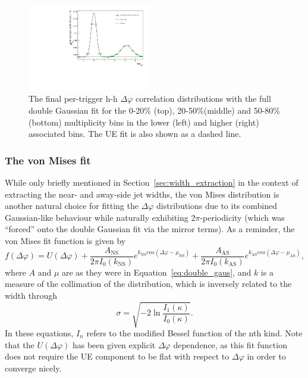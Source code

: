 \begin{figure}[ht]
    \includegraphics[width=0.48\textwidth]{figures/analysis/h_h_dphi_gaus_50_80_highpt.pdf}
    \caption{The final per-trigger h-h $\Delta\varphi$ correlation distributions with the full double Gaussian fit for the 0-20\% (top), 20-50\%(middle) and 50-80\% (bottom) multiplicity bins in the lower (left) and higher (right) associated \pt bins. The UE fit is also shown as a dashed line.}
    \label{fig:double_gaus_fits_h}
\end{figure}

\clearpage

\subsubsection{The von Mises fit}
\label{sec:von_mises_fit}

While only briefly mentioned in Section~\ref{sec:width_extraction} in the context of extracting the near- and away-side jet widths, the von Mises distribution is another natural choice for fitting the $\Delta\varphi$ distributions due to its combined Gaussian-like behaviour while naturally exhibiting $2\pi$-periodicity (which was ``forced'' onto the double Gaussian fit via the mirror terms). As a reminder, the von Mises fit function is given by
%
\begin{equation}
    \label{eq:von_mises}
    f(\Delta\varphi) = U(\Delta\varphi) + \frac{A_{\text{NS}}}{2\pi I_0(k_{\text{NS}})} e^{k_{\text{NS}}cos(\Delta\varphi - \mu_{\text{NS}})} + \frac{A_{\text{AS}}}{2\pi I_0(k_{\text{AS}})} e^{k_{\text{AS}}cos(\Delta\varphi - \mu_{\text{AS}})},
\end{equation}
%
where $A$ and $\mu$ are as they were in Equation~\ref{eq:double_gaus}, and $k$ is a measure of the collimation of the distribution, which is inversely related to the width through
%
\begin{equation}
    \label{eq:kappa_to_sigma}
    \sigma = \sqrt{-2\ln\frac{I_{1}(\kappa)}{I_{0}(\kappa)}}.
\end{equation}
%
In these equations, $I_n$ refers to the modified Bessel function of the nth kind. Note that the $U(\Delta\varphi)$ has been given explicit $\Delta\varphi$ dependence, as this fit function does not require the UE component to be flat with respect to $\Delta\varphi$ in order to converge nicely.

